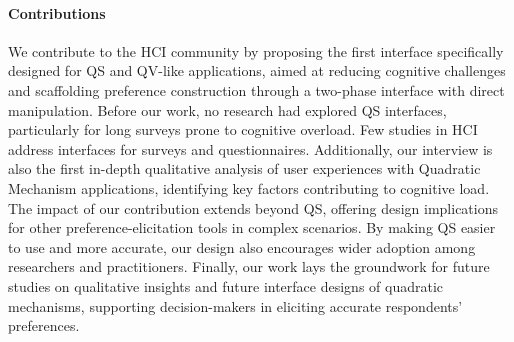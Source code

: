 
\paragraph{Contributions}
We contribute to the HCI community by proposing the first interface specifically designed for QS and QV-like applications, aimed at reducing cognitive challenges and scaffolding preference construction through a two-phase interface with direct manipulation. Before our work, no research had explored QS interfaces, particularly for long surveys prone to cognitive overload. Few studies in HCI address interfaces for surveys and questionnaires.  Additionally, our interview is also the first in-depth qualitative analysis of user experiences with Quadratic Mechanism applications, identifying key factors contributing to cognitive load. The impact of our contribution extends beyond QS, offering design implications for other preference-elicitation tools in complex scenarios. By making QS easier to use and more accurate, our design also encourages wider adoption among researchers and practitioners. Finally, our work lays the groundwork for future studies on qualitative insights and future interface designs of quadratic mechanisms, supporting decision-makers in eliciting accurate respondents' preferences.


